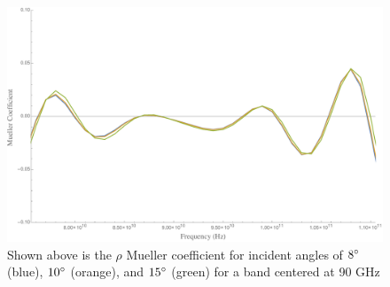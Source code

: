 \documentclass{article}
\theoremstyle{remark}
\begin{document}
\begin{figure}[t!]
	\centering
  \includegraphics[width=.6\linewidth]{MuellerIncAngles.pdf}
  \caption{Shown above is the $\rho$ Mueller coefficient for incident angles of $8\degree$ (blue), $10\degree$ (orange), and $15\degree$ (green) for a band centered at 90 GHz}
  \label{fig:Mueller_incAngles}
\end{figure}

\section*{}
\end{document}
